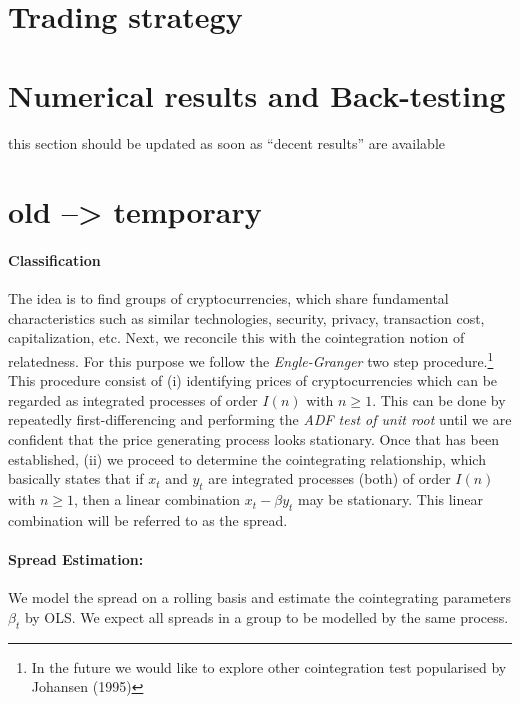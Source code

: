 \documentclass[a4paper,11pt]{article}
\theoremstyle{remark}
\theoremstyle{plain}
\newcommand\ab[1]{{\color{blue} #1 }}
\begin{document}
\section{Trading strategy}
\label{sec:trading}


\section{Numerical results and Back-testing}
\label{sec:results}

\ab{this section should be updated as soon as ``decent results'' are available}

\section{\ab{old --> temporary}}

 \paragraph{Classification}
 
The idea is to find groups of cryptocurrencies, which share fundamental characteristics such as similar technologies, security, privacy, transaction cost, capitalization, etc. Next, we reconcile this with the cointegration notion of relatedness. For this purpose we follow the \textit{Engle-Granger} two step procedure.\footnote{In the future we would like to explore other cointegration test popularised by Johansen (1995)} This procedure consist of (i) identifying prices of cryptocurrencies which can be regarded as integrated processes of order $I(n)$ with $n\geq 1$. This can be done by repeatedly first-differencing and performing the \textit{ADF test of unit root} until we are confident that the price generating process looks stationary. Once that has been established, (ii) we proceed to determine the cointegrating relationship, which basically states that if $x_t$ and $y_t$ are integrated processes (both) of order $I(n)$ with $n \geq 1$, then a linear combination $x_t-\beta y_t$ may be stationary. This linear combination will be referred to as the spread.
 
 \paragraph{Spread Estimation:} We model the spread on a rolling basis and estimate the cointegrating parameters $\beta_t$ by OLS. We expect all spreads in a group to be modelled by the same process. 
\end{document}
